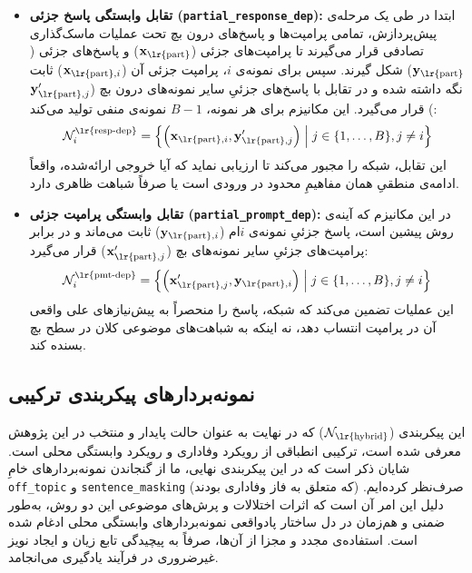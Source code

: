\begin{itemize}
    \item \textbf{تقابل وابستگی پاسخ جزئی (\texttt{partial\_response\_dep}):}
    ابتدا در طی یک مرحله‌ی پیش‌پردازش، تمامی پرامپت‌ها و پاسخ‌های درون بچ تحت عملیات ماسک‌گذاری تصادفی قرار می‌گیرند تا پرامپت‌های جزئی ($\mathbf{x}_{\text{\lr{part}}}$) و پاسخ‌های جزئی ($\mathbf{y}_{\text{\lr{part}}}$) شکل گیرند. سپس برای نمونه‌ی $i$، پرامپت جزئی آن ($\mathbf{x}_{\text{\lr{part}}, i}$) ثابت نگه داشته شده و در تقابل با پاسخ‌های جزئیِ سایر نمونه‌های درون بچ ($\mathbf{y}'_{\text{\lr{part}}, j}$) قرار می‌گیرد. این مکانیزم برای هر نمونه، $B-1$ نمونه‌ی منفی تولید می‌کند:
    \begin{equation}
        \mathcal{N}^{\text{\lr{resp-dep}}}_i = \left\{ \left(\mathbf{x}_{\text{\lr{part}}, i}, \mathbf{y}'_{\text{\lr{part}}, j}\right) \;\middle|\; j \in \{1, \dots, B\}, j \neq i \right\}
    \end{equation}
    این تقابل، شبکه را مجبور می‌کند تا ارزیابی نماید که آیا خروجی ارائه‌شده، واقعاً ادامه‌ی منطقیِ همان مفاهیمِ محدود در ورودی است یا صرفاً شباهت ظاهری دارد.

    \item \textbf{تقابل وابستگی پرامپت جزئی (\texttt{partial\_prompt\_dep}):}
    در این مکانیزم که آینه‌ی روش پیشین است، پاسخ جزئیِ نمونه‌ی $i$ام ($\mathbf{y}_{\text{\lr{part}}, i}$) ثابت می‌ماند و در برابر پرامپت‌های جزئیِ سایر نمونه‌های بچ ($\mathbf{x}'_{\text{\lr{part}}, j}$) قرار می‌گیرد:
    \begin{equation}
        \mathcal{N}^{\text{\lr{pmt-dep}}}_i = \left\{ \left(\mathbf{x}'_{\text{\lr{part}}, j}, \mathbf{y}_{\text{\lr{part}}, i}\right) \;\middle|\; j \in \{1, \dots, B\}, j \neq i \right\}
    \end{equation}
    این عملیات تضمین می‌کند که شبکه، پاسخ را منحصراً به پیش‌نیازهای علی واقعی آن در پرامپت انتساب دهد، نه اینکه به شباهت‌های موضوعی کلان در سطح بچ بسنده کند.
\end{itemize}


\subsection{نمونه‌بردارهای پیکربندی ترکیبی}

این پیکربندی ($\mathcal{N}_{\text{\lr{hybrid}}}$) که در نهایت به عنوان حالت پایدار و منتخب در این پژوهش معرفی شده است، ترکیبی انطباقی از رویکرد وفاداری و رویکرد وابستگی محلی است. شایان ذکر است که در این پیکربندی نهایی، ما از گنجاندن نمونه‌بردارهای خامِ \texttt{off\_topic} و \texttt{sentence\_masking} (که متعلق به فاز وفاداری بودند) صرف‌نظر کرده‌ایم. دلیل این امر آن است که اثرات اختلالات و پرش‌های موضوعی این دو روش، به‌طور ضمنی و هم‌زمان در دل ساختار پادواقعی نمونه‌بردارهای وابستگی محلی ادغام شده است. استفاده‌ی مجدد و مجزا از آن‌ها، صرفاً به پیچیدگی تابع زیان و ایجاد نویز غیرضروری در فرآیند یادگیری می‌انجامد.

